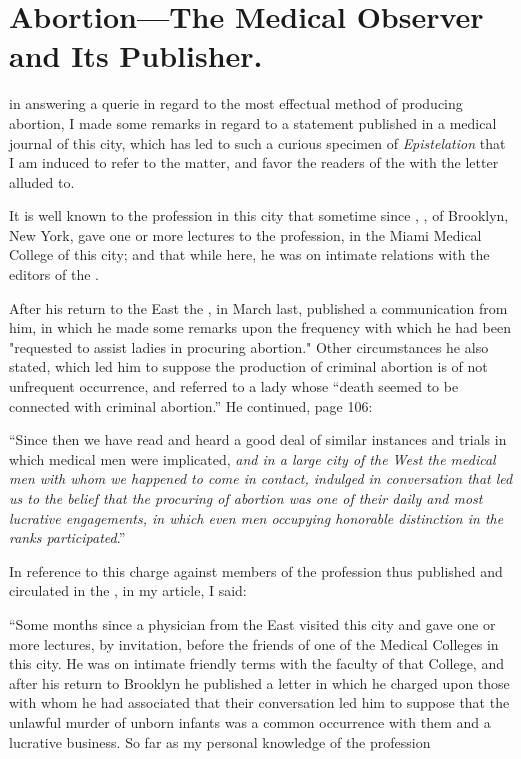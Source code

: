\section*{Abortion---The  Medical  Observer and
Its Publisher.}


 in answering a querie in regard to the
most effectual method of producing abortion, I made some remarks in
regard to a statement published in a medical journal of this city, which
has led to such a curious specimen of \emph{Epistelation} that I am induced
to refer to the matter, and favor the readers of the  with the
letter alluded to.

It is well known to the profession in this city that sometime since
, \md, of Brooklyn, New York, gave one or more lectures
to the profession, in the Miami Medical College of this city; and that
while here, he was on intimate relations with the editors of the .

After his return to the East the , in March last, published a
communication from him, in which he made some remarks upon the
frequency with which he had been "requested to assist ladies in procuring
abortion." Other circumstances he also stated, which led him to
suppose the production of criminal abortion is of not unfrequent occurrence,
and referred to a lady whose ``death seemed to be connected with
criminal abortion.''   He continued, page 106:

``Since then we have read and heard a good deal of similar instances
and trials in which medical men were implicated, \emph{and in a large city
of the West the medical men with whom we happened to come in
contact, indulged in conversation that led us to the belief that the
procuring of abortion was one of their daily and most lucrative
engagements, in which even men occupying honorable distinction in
the ranks participated}.''

In reference to this charge against members of the profession thus
published and circulated in the , in my article, I
said:

``Some months since a physician from the East visited this city and
gave one or more lectures, by invitation, before the friends of one of
the Medical Colleges in this city. He was on intimate friendly terms
with the faculty of that College, and after his return to Brooklyn he
published a letter in which he charged upon those with whom he had
associated that their conversation led him to suppose that the unlawful
murder of unborn infants was a common occurrence with them and a
lucrative business.   So far as my personal knowledge of the profession\endinput

